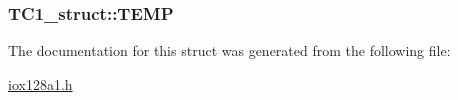 \label{struct_t_c1__struct_aa20c9b601582a41ebbd937fb76611919}
\hypertarget{struct_t_c1__struct_a54d71c9b60b4d2fbddc3fb6b2290709f}{
\subsubsection[{TEMP}]{ {\bf TC1\_\-struct::TEMP}}}
\label{struct_t_c1__struct_a54d71c9b60b4d2fbddc3fb6b2290709f}


The documentation for this struct was generated from the following file:\begin{DoxyCompactItemize}
\item 
\hyperlink{iox128a1_8h}{iox128a1.h}\end{DoxyCompactItemize}
